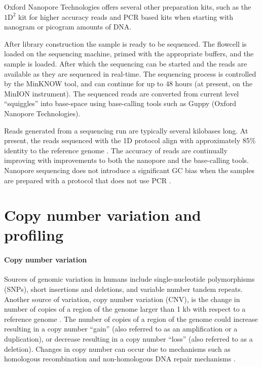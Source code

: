 Oxford Nanopore Technologies offers several other preparation kits, such
as the $\text{1D}^2$ kit for higher accuracy reads and PCR based kits when
starting with nanogram or picogram amounts of DNA.

After library construction the sample is ready to be sequenced. The
flowcell is loaded on the sequencing machine, primed with the appropriate
buffers, and the sample is loaded. After which the sequencing can be
started and the reads are available as they are sequenced in real-time.
%
The sequencing process is controlled by the MinKNOW tool, and can
continue for up to 48 hours (at present, on the MinION instrument).
The sequenced reads are converted from current level ``squiggles'' into
base-space using base-calling tools such as Guppy (Oxford Nanopore
Technologies).

Reads generated from a sequencing run are typically several kilobases
long.
At present, the reads sequenced with the 1D protocol align with
approximately 85\% identity to the reference genome
\citep{bowden2019sequencing,jain2018nanopore,carter2017robust}.  The
accuracy of reads are continually improving with improvements to both
the nanopore and the base-calling tools.
Nanopore sequencing does not introduce a significant GC bias when the
samples are prepared with a protocol that does not use PCR
\citep{carter2017robust}.


\section{Copy number variation and profiling}
\paragraph{Copy number variation}
Sources of genomic variation in humans include single-nucleotide
polymorphisms (SNPs), short insertions and deletions, and variable
number tandem repeats.
Another source of variation, copy number variation (CNV), is the change
in number of copies of a region of the genome larger than 1 kb with
respect to a reference genome
\citep{redon2006global,feuk2006structural}.  The number of copies of a
region of the genome could increase resulting in a copy number ``gain''
(also referred to as an amplification or a duplication), or decrease
resulting in a copy number ``loss'' (also referred to as a deletion).
Changes in copy number can occur due to mechanisms such as homologous
recombination and non-homologous DNA repair mechanisms
\citep{hastings2009mechanisms,van2011origins,stankiewicz2010structural}.

